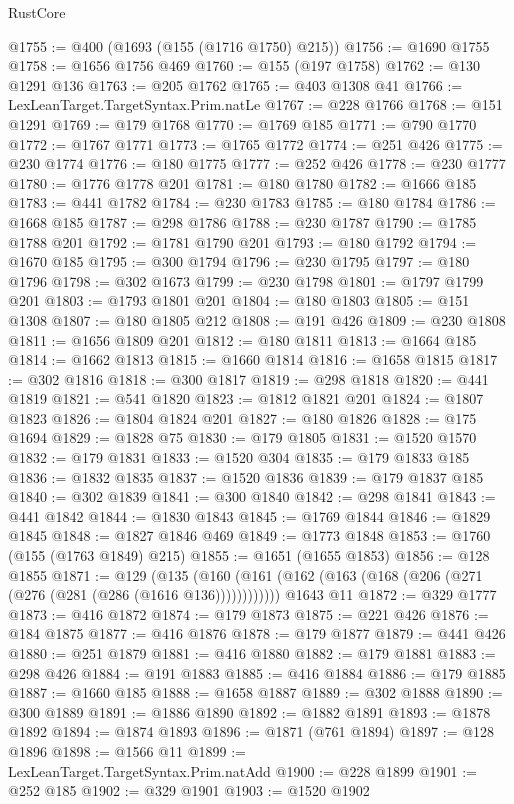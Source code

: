 \begin{lexlean}{RustCore}
\begin{coremodule}
@1755 := @400 (@1693 (@155 (@1716 @1750) @215))
@1756 := @1690 @1755
@1758 := @1656 @1756 @469
@1760 := @155 (@197 @1758)
@1762 := @130 @1291 @136
@1763 := @205 @1762
@1765 := @403 @1308 @41
@1766 := LexLeanTarget.TargetSyntax.Prim.natLe
@1767 := @228 @1766
@1768 := @151 @1291
@1769 := @179 @1768
@1770 := @1769 @185
@1771 := @790 @1770
@1772 := @1767 @1771
@1773 := @1765 @1772
@1774 := @251 @426
@1775 := @230 @1774
@1776 := @180 @1775
@1777 := @252 @426
@1778 := @230 @1777
@1780 := @1776 @1778 @201
@1781 := @180 @1780
@1782 := @1666 @185
@1783 := @441 @1782
@1784 := @230 @1783
@1785 := @180 @1784
@1786 := @1668 @185
@1787 := @298 @1786
@1788 := @230 @1787
@1790 := @1785 @1788 @201
@1792 := @1781 @1790 @201
@1793 := @180 @1792
@1794 := @1670 @185
@1795 := @300 @1794
@1796 := @230 @1795
@1797 := @180 @1796
@1798 := @302 @1673
@1799 := @230 @1798
@1801 := @1797 @1799 @201
@1803 := @1793 @1801 @201
@1804 := @180 @1803
@1805 := @151 @1308
@1807 := @180 @1805 @212
@1808 := @191 @426
@1809 := @230 @1808
@1811 := @1656 @1809 @201
@1812 := @180 @1811
@1813 := @1664 @185
@1814 := @1662 @1813
@1815 := @1660 @1814
@1816 := @1658 @1815
@1817 := @302 @1816
@1818 := @300 @1817
@1819 := @298 @1818
@1820 := @441 @1819
@1821 := @541 @1820
@1823 := @1812 @1821 @201
@1824 := @1807 @1823
@1826 := @1804 @1824 @201
@1827 := @180 @1826
@1828 := @175 @1694
@1829 := @1828 @75
@1830 := @179 @1805
@1831 := @1520 @1570
@1832 := @179 @1831
@1833 := @1520 @304
@1835 := @179 @1833 @185
@1836 := @1832 @1835
@1837 := @1520 @1836
@1839 := @179 @1837 @185
@1840 := @302 @1839
@1841 := @300 @1840
@1842 := @298 @1841
@1843 := @441 @1842
@1844 := @1830 @1843
@1845 := @1769 @1844
@1846 := @1829 @1845
@1848 := @1827 @1846 @469
@1849 := @1773 @1848
@1853 := @1760 (@155 (@1763 @1849) @215)
@1855 := @1651 (@1655 @1853)
@1856 := @128 @1855
@1871 := @129
    (@135 (@160 (@161 (@162 (@163 (@168 (@206 (@271 (@276 (@281 (@286 (@1616 @136))))))))))))
    @1643
    @11
@1872 := @329 @1777
@1873 := @416 @1872
@1874 := @179 @1873
@1875 := @221 @426
@1876 := @184 @1875
@1877 := @416 @1876
@1878 := @179 @1877
@1879 := @441 @426
@1880 := @251 @1879
@1881 := @416 @1880
@1882 := @179 @1881
@1883 := @298 @426
@1884 := @191 @1883
@1885 := @416 @1884
@1886 := @179 @1885
@1887 := @1660 @185
@1888 := @1658 @1887
@1889 := @302 @1888
@1890 := @300 @1889
@1891 := @1886 @1890
@1892 := @1882 @1891
@1893 := @1878 @1892
@1894 := @1874 @1893
@1896 := @1871 (@761 @1894)
@1897 := @128 @1896
@1898 := @1566 @11
@1899 := LexLeanTarget.TargetSyntax.Prim.natAdd
@1900 := @228 @1899
@1901 := @252 @185
@1902 := @329 @1901
@1903 := @1520 @1902

\end{coremodule}
\end{lexlean}
